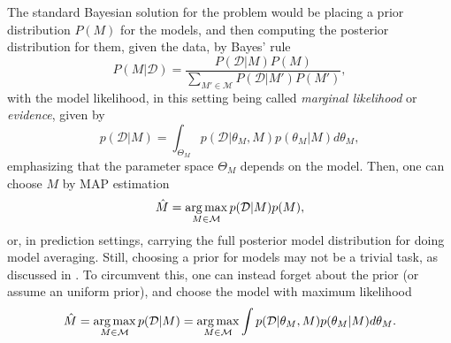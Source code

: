 The standard Bayesian solution for the problem would be placing a prior distribution $P(M)$ for the models, and then computing the posterior distribution for them, given the data, by Bayes' rule
\begin{equation}
 P(M|\mathcal{D}) = \frac{P(\mathcal{D}|M) P(M)}{\sum_{M' \in \mathcal{M}} P(\mathcal{D}|M') P(M')},
\end{equation}
with the model likelihood, in this setting being called \textit{marginal likelihood} or \textit{evidence}, given by
\begin{equation}\label{marginalization_3}
p(\mathcal{D} | M) = \int_{\Theta_M} p(\mathcal{D} | \theta_M, M) p(\theta_M | M) d\theta_M,
\end{equation}
emphasizing that the parameter space $\Theta_M$ depends on the model.  
Then, one can choose $M$ by MAP estimation 
\begin{equation}
 \hat{M} = \operatorname*{arg\,max}_{M \in \mathcal{M}} p(\mathcal{D} |M) p(M),
\end{equation}
or, in prediction settings, carrying the full posterior model distribution for doing model averaging. Still, choosing a prior for models may not be a trivial task, as discussed in \cite{Robert_2001}. To circumvent this, one can instead forget about the prior (or assume an uniform prior), and choose the model with maximum likelihood
\begin{equation}\label{modelselectionobjective}
\hat{M} = \operatorname*{arg\,max}_{M \in \mathcal{M}} p(\mathcal{D} | M) = \operatorname*{arg\,max}_{M \in \mathcal{M}} \int p(\mathcal{D} | \theta_M, M) p(\theta_M | M) d\theta_M.
\end{equation}

